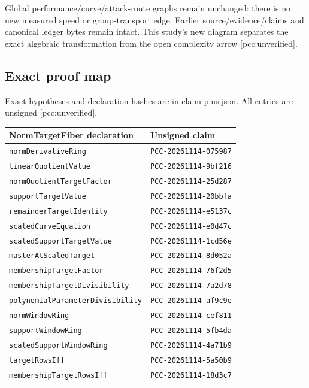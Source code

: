 \documentclass[
  10pt,
]{article}
\begin{document}
Global performance/curve/attack-route graphs remain unchanged: there is
no new measured speed or group-transport edge. Earlier
source/evidence/claims and canonical ledger bytes remain intact. This
study's new diagram separates the exact algebraic transformation from
the open complexity arrow {[}pcc:unverified{]}.

\subsection{Exact proof map}\label{exact-proof-map}

Exact hypotheses and declaration hashes are in claim-pins.json. All
entries are unsigned {[}pcc:unverified{]}.

\begin{longtable}[]{@{}ll@{}}
\toprule\noalign{}
NormTargetFiber declaration & Unsigned claim \\
\midrule\noalign{}
\endhead
\bottomrule\noalign{}
\endlastfoot
\texttt{normDerivativeRing} & \texttt{PCC-20261114-075987} \\
\texttt{linearQuotientValue} & \texttt{PCC-20261114-9bf216} \\
\texttt{normQuotientTargetFactor} & \texttt{PCC-20261114-25d287} \\
\texttt{supportTargetValue} & \texttt{PCC-20261114-20bbfa} \\
\texttt{remainderTargetIdentity} & \texttt{PCC-20261114-e5137c} \\
\texttt{scaledCurveEquation} & \texttt{PCC-20261114-e0d47c} \\
\texttt{scaledSupportTargetValue} & \texttt{PCC-20261114-1cd56e} \\
\texttt{masterAtScaledTarget} & \texttt{PCC-20261114-8d052a} \\
\texttt{membershipTargetFactor} & \texttt{PCC-20261114-76f2d5} \\
\texttt{membershipTargetDivisibility} & \texttt{PCC-20261114-7a2d78} \\
\texttt{polynomialParameterDivisibility} &
\texttt{PCC-20261114-af9c9e} \\
\texttt{normWindowRing} & \texttt{PCC-20261114-cef811} \\
\texttt{supportWindowRing} & \texttt{PCC-20261114-5fb4da} \\
\texttt{scaledSupportWindowRing} & \texttt{PCC-20261114-4a71b9} \\
\texttt{targetRowsIff} & \texttt{PCC-20261114-5a50b9} \\
\texttt{membershipTargetRowsIff} & \texttt{PCC-20261114-18d3c7} \\

\end{longtable}
\end{document}
